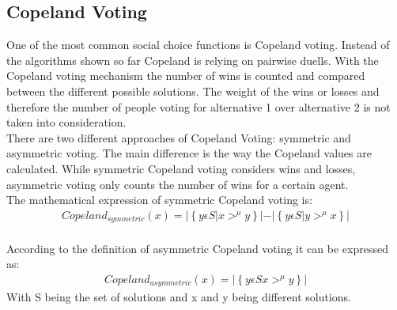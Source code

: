 \documentclass[german, a4paper, 11pt, oneside]{scrbook}
\begin{document}
\subsection{Copeland Voting}
One of the most common social choice functions is Copeland voting.  Instead of the algorithms shown so far Copeland is relying on pairwise duells. With the Copeland voting mechanism the number of wins is counted and compared between the different possible solutions. The weight of the wins or losses and therefore the number of people voting for alternative 1 over alternative 2 is not taken into consideration. \cite{ALEXANDERJOHANPHILIPPEEK.2022,FelixBrandtVincentConitzerUlleEndrissJeromeLangandArielD.Procaccia.}  \\There are two different approaches of Copeland Voting: symmetric and asymmetric voting. The main difference is the way the Copeland values are calculated. While symmetric Copeland voting considers wins and losses, asymmetric voting only counts the number of wins for a certain agent.
\\The mathematical expression of symmetric Copeland voting is: \cite{FelixBrandtVincentConitzerUlleEndrissJeromeLangandArielD.Procaccia.}
\begin{align}
Copeland_{symmetric}(x) = \left| \left\{ y \epsilon S \left| x>^\mu y \right\} \left| - \right| \left\{ y \epsilon S   \right| y>^\mu x   \right\} \right|
\end{align}
\\According to the definition of asymmetric Copeland voting it can be expressed as:
\begin{align}
Copeland_{asymmetric}(x) = \left| \left\{ y \epsilon S  x>^\mu y \right\}  \right|
\end{align}
With S being the set of solutions and x and y being different solutions.
\end{document}
